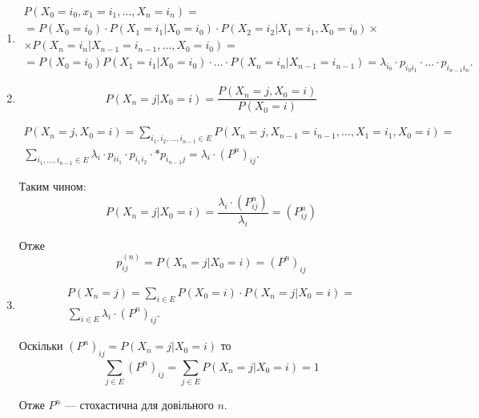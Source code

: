 \begin{enumerate}
  \item 

\begin{align*}
   P\left( X_0 = i_0, x_1=i_1, \ldots, X_n = i_n \right) = \\
   = P\left( X_0 = i_0 \right) \cdot P(X_1 = i_1 | X_0 = i_0) \cdot  P\left( X_2 = i_2 | X_1 = i_1, X_0 = i_0 \right) \times \\
   \times P\left( X_n = i_n | X_{n-1} = i_{n-1}, \ldots, X_0 = i_0 \right) = \\
   = P(X_0 = i_0) P\left( X_1 = i_1 | X_0 = i_0 \right) \cdot \ldots\cdot P\left( 
   X_n = i_n | X_{n-1} = i_{n-1}\right) =
   \boxed{\lambda_{i_0} \cdot  p_{i_0 i_1} \cdot \ldots \cdot p_{i_{n-1} i_n}}
.\end{align*}

\item
\[ P\left( X_n = j | X_0 = i \right) = \frac{P\left( X_n = j, X_0 = i \right) }{P(X_0 = i)} \] 

\begin{align*}
  P\left( X_n = j, X_0 = i \right) = \sum_{i_1, i_2, \ldots, i_{n-1} \in  E}^{} P\left( X_n = j, X_{n-1} = i_{n-1}, \ldots,
  X_1 = i_1, X_0 = i \right) = \\
  \sum_{i_1, \ldots, i_{n-1} \in  E}^{} \lambda_i \cdot  p_{ii_1} \cdot  p_{i_1 i_2} \cdot * p_{i_{n-1}j} =
  \boxed{\lambda_i \cdot  \left( P^{n} \right) _{ij}}
.\end{align*}

Таким чином:
\[ P\left( X_n = j | X_0 = i \right) = \frac{\lambda _i \cdot \left( P^{n}_{ij} \right) }{\lambda _i} = \left( P^{n}_{ij} \right)  \] 

Отже \[ \boxed{ p^{(n)}_{ij} = P\left( X_n = j |X_0 = i \right) = \left( P^{n} \right) _{ij} } \] 

\item
\begin{align*}
  P\left( X_n = j \right) = \sum_{i \in E}^{} P\left( X_0 = i \right) \cdot  P\left( X_n = j | X_0 = i \right) = \\
  \sum_{i \in  E}^{} \lambda _i \cdot \left( P^{n} \right) _{ij}
.\end{align*}

Оскільки $\left( P^{n} \right)_{ij} = P\left( X_n = j| X_0 = i \right) $ 
то \[ \sum_{j \in  E}^{} \left( P^{n} \right) _{ij} = \sum_{j \in  E}^{} P\left( X_n = j |X_0 = i \right) = 1 \]

Отже $P^{n}$ --- стохастична для довільного $n$.

\end{enumerate}

